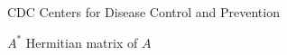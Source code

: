 \begin{siglas}
    \item[CDC] Centers for Disease Control and Prevention
\end{siglas}
  
\begin{simbolos}
    \item[$A^*$] Hermitian matrix of $A$ 
\end{simbolos}
